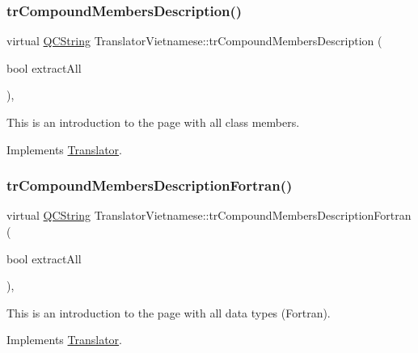 \subsubsection{\texorpdfstring{trCompoundMembersDescription()}{trCompoundMembersDescription()}}
{\footnotesize\ttfamily virtual \mbox{\hyperlink{class_q_c_string}{Q\+C\+String}} Translator\+Vietnamese\+::tr\+Compound\+Members\+Description (\begin{DoxyParamCaption}\item[{bool}]{extract\+All }\end{DoxyParamCaption})\hspace{0.3cm}{\ttfamily [inline]}, {\ttfamily [virtual]}}

This is an introduction to the page with all class members. 

Implements \mbox{\hyperlink{class_translator}{Translator}}.

\mbox{\label{class_translator_vietnamese_a505d25947ec5f796e862d507d42b86e2}} 
\subsubsection{\texorpdfstring{trCompoundMembersDescriptionFortran()}{trCompoundMembersDescriptionFortran()}}
{\footnotesize\ttfamily virtual \mbox{\hyperlink{class_q_c_string}{Q\+C\+String}} Translator\+Vietnamese\+::tr\+Compound\+Members\+Description\+Fortran (\begin{DoxyParamCaption}\item[{bool}]{extract\+All }\end{DoxyParamCaption})\hspace{0.3cm}{\ttfamily [inline]}, {\ttfamily [virtual]}}

This is an introduction to the page with all data types (Fortran). 

Implements \mbox{\hyperlink{class_translator}{Translator}}.

\mbox{\label{class_translator_vietnamese_a02e7fee95bb3d99bb65de305dc0e9a7c}} 
